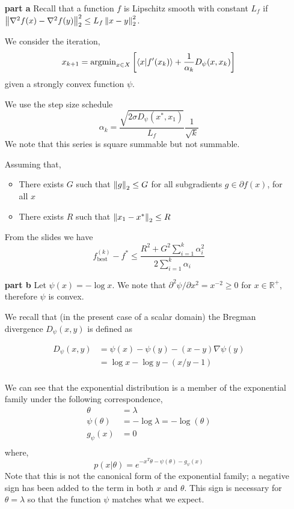 \documentclass{article}
\begin{document}
\begin{enumerate}
\item[\bf part a]
  Recall that a function $f$ is Lipschitz smooth with constant $L_f$
  if $\left\lVert \nabla^2 f(x) - \nabla^2 f(y) \right\rVert_2^2 \le L_f \left\lVert x-y \right\rVert_2^2$.

  We consider the iteration,
  \[ x_{k+1} = \mathrm{argmin}_{x \in X} \left[ \braket{x \vert f'(x_k)} + \frac{1}{\alpha_k}
      D_\psi(x, x_k) \right] \]
  given a strongly convex function $\psi$.

  We use the step size schedule
  \[ \alpha_k = \frac{\sqrt{2 \sigma D_\psi(x^*, x_1)}}{L_f} \frac{1}{\sqrt k} \]
  We note that this series is square summable but not summable.

  Assuming that,

  \begin{itemize}
  \item There exists $G$ such that $\left\lVert g \right\rVert_2 \le G$ for all
    subgradients $g \in \partial f(x)$, for all $x$
  \item There exists $R$ such that $\left\lVert x_1 - x^* \right\rVert_2 \le R$
  \end{itemize}

  From the slides we have
  \[ f_\mathrm{best}^{(k)} - f^* \le \frac{R^2 + G^2 \sum_{i=1}^k \alpha_i^2}{2\sum_{i=1}^k \alpha_i}  \]


\item[\bf part b]
  Let $\psi(x) = - \log x$. We note that $\partial^2\psi / \partial
  x^2 = x^{-2} \ge 0$ for $x \in \mathbb{R}^+$, therefore $\psi$ is
  convex.

  We recall that (in the present case of a scalar domain) the Bregman
  divergence $D_\psi (x,y)$ is defined as

  \begin{align*}
    D_\psi (x,y) & = \psi(x) - \psi(y) - (x-y) \nabla\psi(y) \\
                & = \log x - \log y - (x/y - 1) \\
  \end{align*}

  We can see that the exponential distribution is a member of the
  exponential family under the following correspondence,
  \begin{align*}
    \theta & = \lambda \\
    \psi(\theta) & = -\log \lambda = -\log(\theta) \\
    g_\psi(x) & = 0 \\
  \end{align*}
  where,
  \[ p(x \vert \theta) = e^{-x^T \theta - \psi(\theta) - g_\psi(x)} \]
  Note that this is not the canonical form of the exponential family;
a negative sign has been added to the term in both $x$ and
$\theta$. This sign is necessary for $\theta = \lambda$ so that the
function $\psi$ matches what we expect.
\end{enumerate}
\end{document}
